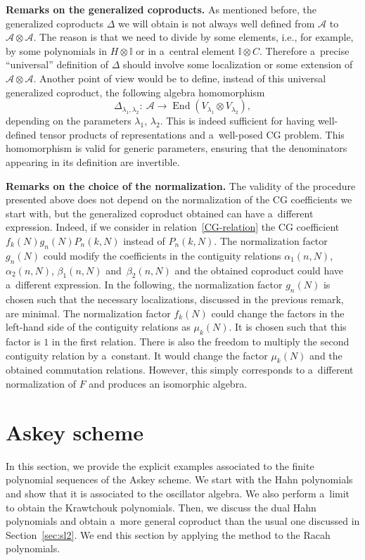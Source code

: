 \documentclass[pdftex]{sigma}
\numberwithin{equation}{section}
\theoremstyle{definition}
\begin{document}
{\bf Remarks on the generalized coproducts.} As mentioned before, the generalized coproducts $\Delta$ we will obtain is not always well defined from $\mathcal{A}$ to $\mathcal{A}\otimes \mathcal{A}$. The reason is that we need to divide by some elements, i.e., for example, by some polynomials in $H\otimes \mathbb{I}$ or in a~central element $\mathbb{I}\otimes C$. Therefore a~precise ``universal'' definition of $\Delta$ should involve some localization or some extension of $\mathcal{A}\otimes\mathcal{A}$. Another point of view would be to define, instead of this universal generalized coproduct, the following algebra homomorphism
\[\Delta_{\lambda_1,\lambda_2}\colon \ \mathcal{A} \to \operatorname{End}(V_{\lambda_1}\otimes V_{\lambda_2}),\]
depending on the parameters $\lambda_1$, $\lambda_2$. This is indeed sufficient for having well-defined tensor products of representations and a~well-posed CG problem. This homomorphism is valid for generic parameters, ensuring that the denominators appearing in its definition are invertible.

{\bf Remarks on the choice of the normalization.} The validity of the procedure presented above does not depend on the normalization of the CG coefficients we start with, but the generalized coproduct obtained can have a~different expression. Indeed, if we consider in relation~\eqref{CG-relation} the CG coefficient $f_k(N)g_n(N)P_n(k,N)$ instead of $P_n(k,N)$. The normalization factor~$g_n(N)$ could modify the coefficients in the contiguity relations $\alpha_1(n,N)$, $\alpha_2(n,N)$, $\beta_1(n,N)$ and~$\beta_2(n,N)$ and the obtained coproduct could have a~different expression. In the following, the normalization factor $g_n(N)$ is chosen such that the necessary localizations, discussed in the previous remark, are minimal. The normalization factor $f_k(N)$ could change the factors in the left-hand side of the contiguity relations as $\mu_k(N)$. It is chosen such that this factor is $1$ in the first relation.
There is also the freedom to multiply the second contiguity relation by a~constant. It would change the factor $\mu_k(N)$ and the obtained commutation relations. However, this simply corresponds to a~different normalization of $F$ and produces an isomorphic algebra.

\section{Askey scheme} \label{sec:askey}

In this section, we provide the explicit examples associated to the finite polynomial sequences of the Askey scheme. We start with the Hahn polynomials and show that it is associated to the oscillator algebra. We also perform a~limit to obtain the Krawtchouk polynomials. Then, we discuss the dual Hahn polynomials and obtain a~more general coproduct than the usual one discussed in Section~\ref{sec:sl2}. We end this section by applying the method to the Racah polynomials.
\end{document}

